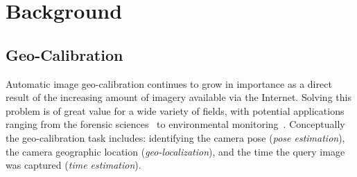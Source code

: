 \section{Background}

\subsection{Geo-Calibration}
Automatic image geo-calibration continues to grow in importance as a
direct result of the increasing amount of imagery available
via the Internet. 
Solving this problem is of great value for a wide variety of fields,
with potential applications ranging from the forensic
sciences~\cite{stylianou13jane} to environmental
monitoring~\cite{zhang2012mining}.
Conceptually the geo-calibration task includes:
identifying the camera pose ({\em pose estimation}), the camera
geographic location ({\em geo-localization}), and the time the query
image was captured ({\em time estimation}).

